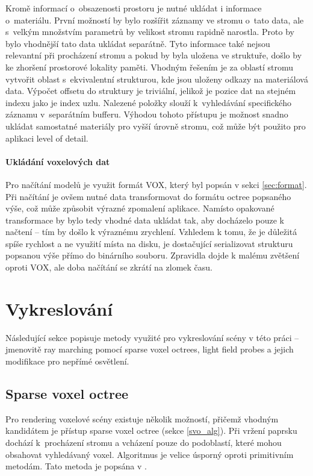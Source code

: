 Kromě informací o~obsazenosti prostoru je nutné ukládat i informace o~materiálu. První možností by bylo rozšířit záznamy ve stromu o~tato data, ale s~velkým množstvím parametrů by velikost stromu rapidně narostla. Proto by bylo vhodnější tato data ukládat separátně. Tyto informace také nejsou relevantní při procházení stromu a pokud by byla uložena ve struktuře, došlo by ke zhoršení prostorové lokality paměti. Vhodným řešením je za oblastí stromu vytvořit oblast s~ekvivalentní strukturou, kde jsou uloženy odkazy na materiálová data. Výpočet offsetu do struktury je triviální, jelikož je pozice dat na stejném indexu jako je index uzlu. Nalezené položky slouží k~vyhledávání specifického záznamu v~separátním bufferu. Výhodou tohoto přístupu je možnost snadno ukládat samostatné materiály pro vyšší úrovně stromu, což může být použito pro aplikaci level of detail.

\paragraph{Ukládání voxelových dat} Pro načítání modelů je využit formát VOX, který byl popsán v sekci \ref{sec:format}. Při načítání je ovšem nutné data transformovat do formátu octree popsaného výše, což může způsobit výrazné zpomalení aplikace. Namísto opakované transformace by bylo tedy vhodné data ukládat tak, aby docházelo pouze k načtení -- tím by došlo k výraznému zrychlení. Vzhledem k tomu, že je důležitá spíše rychlost a ne využití místa na disku, je dostačující serializovat strukturu popsanou výše přímo do binárního souboru. Zpravidla dojde k malému zvětšení oproti VOX, ale doba načítání se zkrátí na zlomek času.

\section{Vykreslování}\label{sec:rendering}
Následující sekce popisuje metody využité pro vykreslování scény v této práci -- jmenovitě ray marching pomocí sparse voxel octrees, light field probes a jejich modifikace pro nepřímé osvětlení.

\subsection{Sparse voxel octree}\label{sec:svo_design}
Pro rendering voxelové scény existuje několik možností, přičemž vhodným kandidátem je přístup sparse voxel octree (sekce \ref{svo_alg}). Při vržení paprsku dochází k~procházení stromu a vcházení pouze do podoblastí, které mohou obsahovat vyhledávaný voxel. Algoritmus je velice úsporný oproti primitivním metodám. Tato metoda je popsána v \cite{Laine2011EfficientSV}.

